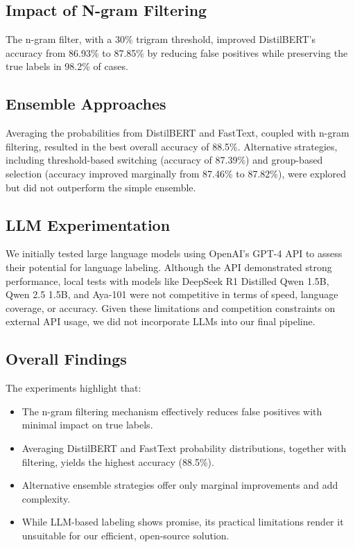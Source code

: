 \documentclass[11pt]{article}
\begin{document}
\subsection{Impact of N-gram Filtering}
The n-gram filter, with a 30\% trigram threshold, improved DistilBERT’s accuracy from 86.93\% to 87.85\% by reducing false positives while preserving the true labels in 98.2\% of cases.

\subsection{Ensemble Approaches}
Averaging the probabilities from DistilBERT and FastText, coupled with n-gram filtering, resulted in the best overall accuracy of 88.5\%. Alternative strategies, including threshold-based switching (accuracy of 87.39\%) and group-based selection (accuracy improved marginally from 87.46\% to 87.82\%), were explored but did not outperform the simple ensemble.

\subsection{LLM Experimentation}
We initially tested large language models using OpenAI’s GPT-4 API to assess their potential for language labeling. Although the API demonstrated strong performance, local tests with models like DeepSeek R1 Distilled Qwen 1.5B, Qwen 2.5 1.5B, and Aya-101 were not competitive in terms of speed, language coverage, or accuracy. Given these limitations and competition constraints on external API usage, we did not incorporate LLMs into our final pipeline.

\subsection{Overall Findings}
The experiments highlight that:
\begin{itemize}
    \item The n-gram filtering mechanism effectively reduces false positives with minimal impact on true labels.
    \item Averaging DistilBERT and FastText probability distributions, together with filtering, yields the highest accuracy (88.5\%).
    \item Alternative ensemble strategies offer only marginal improvements and add complexity.
    \item While LLM-based labeling shows promise, its practical limitations render it unsuitable for our efficient, open-source solution.
\end{itemize}
\end{document}

